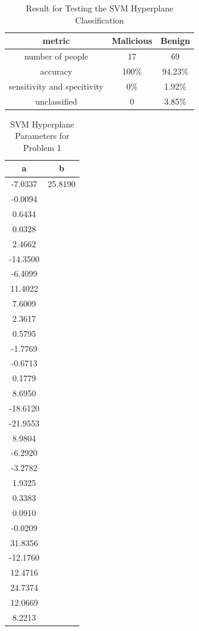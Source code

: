 \begin{table}[h]
    \centering
    \begin{tabular}{c || c | c}
         metric & Malicious & Benign  \\
         \hline
         number of people & 17 & 69 \\
         \hline
         accuracy & 100\% & 94.23\% \\ 
         sensitivity and specitivity & 0\% & 1.92\% \\
         unclassified & 0 & 3.85\%\\
    \end{tabular}
    \caption{Result for Testing the SVM Hyperplane Classification}
    \label{tab:svm_test}
\end{table}

\begin{table}
    \centering
    \begin{tabular}{c c}
 a & b\\
 \hline
 \hline
   -7.0337 & 25.8190\\
   -0.0094\\
    0.6434\\
    0.0328\\
    2.4662\\
  -14.3500\\
   -6.4099\\
   11.4022\\
    7.6009\\
    2.3617\\
    0.5795\\
   -1.7769\\
   -0.6713\\
    0.1779\\
    8.6950\\
  -18.6120\\
  -21.9553\\
    8.9804\\
   -6.2920\\
   -3.2782\\
    1.9325\\
    0.3383\\
    0.0910\\
   -0.0209\\
   31.8356\\
  -12.1760\\
   12.4716\\
   24.7374\\
   12.0669\\
    8.2213\\
    \end{tabular}
    \caption{SVM Hyperplane Parameters for Problem 1}
    \label{tab:svm_param}
\end{table}

